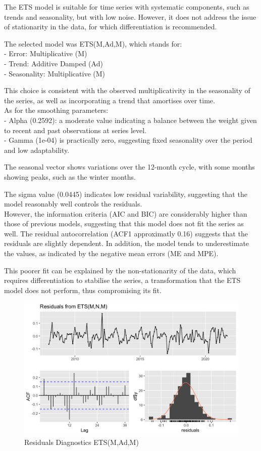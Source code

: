 The ETS model is suitable for time series with systematic components, such as trends and seasonality, but with low noise. However, it does not address the issue of stationarity in the data, for which differentiation is recommended.

The selected model was ETS(M,Ad,M), which stands for:\\
- Error: Multiplicative (M)\\
- Trend: Additive Damped (Ad)\\
- Seasonality: Multiplicative (M)

This choice is consistent with the observed multiplicativity in the seasonality of the series, as well as incorporating a trend that amortises over time.\\

As for the smoothing parameters:\\
- Alpha (0.2592): a moderate value indicating a balance between the weight given to recent and past observations at series level.\\
- Gamma (1e-04) is practically zero, suggesting fixed seasonality over the period and low adaptability.

The seasonal vector shows variations over the 12-month cycle, with some months showing peaks, such as the winter months.

The sigma value (0.0445) indicates low residual variability, suggesting that the model reasonably well controls the residuals.\\

However, the information criteria (AIC and BIC) are considerably higher than those of previous models, suggesting that this model does not fit the series as well.
The residual autocorrelation (ACF1 approximatly 0.16) suggests that the residuals are slightly dependent. In addition, the model tends to underestimate the values, as indicated by the negative mean errors (ME and MPE).

This poorer fit can be explained by the non-stationarity of the data, which requires differentiation to stabilise the series, a transformation that the ETS model does not perform, thus compromising its fit.\\

\begin{figure}[H]
    \centering
    \includegraphics[width=1\linewidth]{images/ets_res.png}
    \caption{Residuals Diagnostics ETS(M,Ad,M)}
    \label{fig:res_ets}
\end{figure}

